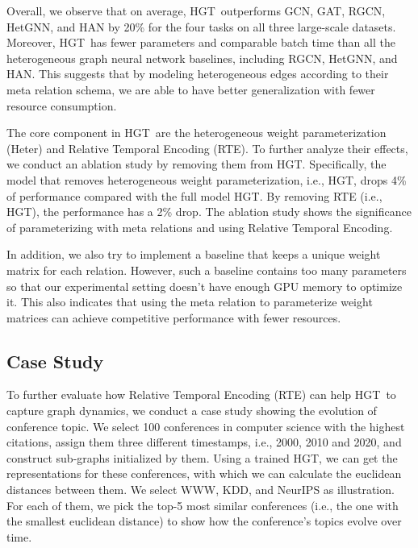 \documentclass[sigconf]{acmart}
\theoremstyle{definition}
\newcommand{\short}{HGT}
\begin{document}
Overall, we observe that on average, \short\ outperforms GCN, GAT, RGCN, HetGNN, and HAN by 20\% for the four tasks on all three large-scale datasets.  
Moreover, \short\ has fewer parameters and comparable batch time than all the heterogeneous graph neural network baselines, including RGCN, HetGNN, and HAN. 
This suggests that by modeling heterogeneous edges according to their meta relation schema, we are able to have better generalization with fewer resource consumption. 



The core component in \short\ are the heterogeneous weight parameterization (Heter) and Relative Temporal Encoding (RTE).
To further analyze their effects, we conduct an ablation study by removing them from \short. 
Specifically, the model that removes heterogeneous weight parameterization, i.e., \short, drops 4\% of performance compared with the full model \short. 
By removing RTE (i.e., \short), the performance has a 2\% drop. 
The ablation study shows the significance of parameterizing with meta relations and using Relative Temporal Encoding.



In addition, we also try to implement a baseline that keeps a unique weight matrix for each relation. However, such a baseline contains too many parameters so that our experimental setting doesn't have enough GPU memory to optimize it. This also indicates that using the meta relation to parameterize weight matrices can achieve competitive performance with fewer resources.


\subsection{Case Study}

To further evaluate how  Relative Temporal Encoding (RTE) can help \short\ to capture graph dynamics, we conduct a case study showing the evolution of conference topic. 
We select 100 conferences in computer science with the highest citations, assign them three different timestamps, i.e., 2000, 2010 and 2020, and construct sub-graphs initialized by them. 
Using a trained HGT, we can get the representations for these conferences, with which we can calculate the euclidean distances between them. 
We select WWW, KDD, and NeurIPS as illustration. 
For each of them, we pick the top-5 most similar conferences (i.e., the one with the smallest euclidean distance) to show how the conference's topics evolve over time. 
\end{document}
